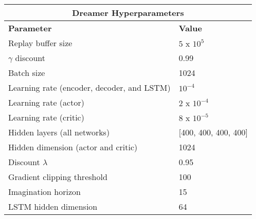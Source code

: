 \begin{table}[h]
\begin{tabular}{|l|l|}
\hline
\multicolumn{2}{|c|}{\textbf{Dreamer Hyperparameters}} \\ \hline
\textbf{Parameter} & \textbf{Value} \\ \hline
Replay buffer size & $5 \text{ x } 10^{5}$ \\ \hline
$\gamma$ discount & 0.99 \\ \hline
Batch size & 1024 \\ \hline
Learning rate (encoder, decoder, and LSTM) & $10^{-4}$ \\ \hline
Learning rate (actor) & $2 \text{ x } 10^{-4}$ \\ \hline
Learning rate (critic) & $8 \text{ x } 10^{-5}$ \\ \hline
Hidden layers (all networks) & [400, 400, 400, 400] \\ \hline
Hidden dimension (actor and critic) & 1024 \\ \hline
Discount $\lambda$ & 0.95 \\ \hline
Gradient clipping threshold & 100 \\ \hline
Imagination horizon & 15 \\ \hline
LSTM hidden dimension & 64 \\ \hline
\end{tabular}
\end{table}